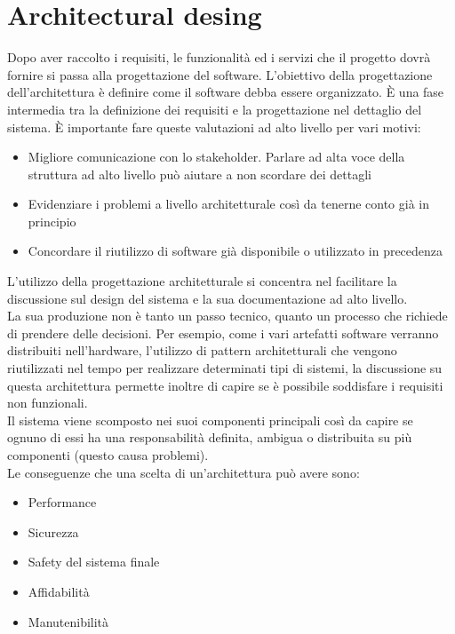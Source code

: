 \section{Architectural desing}
\label{sec:06_architectural_desing}
Dopo aver raccolto i requisiti, le funzionalità ed i servizi che il progetto dovrà fornire si passa alla progettazione del software.
L'obiettivo della progettazione dell'architettura è definire come il software debba essere organizzato.
È una fase intermedia tra la definizione dei requisiti e la progettazione nel dettaglio del sistema.
È importante fare queste valutazioni ad alto livello per vari motivi:
\begin{itemize}[noitemsep]
    \item Migliore comunicazione con lo stakeholder. Parlare ad alta voce della struttura ad alto livello può aiutare a non scordare dei dettagli
    \item Evidenziare i problemi a livello architetturale così da tenerne conto già in principio
    \item Concordare il riutilizzo di software già disponibile o utilizzato in precedenza
\end{itemize}
L'utilizzo della progettazione architetturale si concentra nel facilitare la discussione sul design del sistema e la sua documentazione ad alto livello.\\
La sua produzione non è tanto un passo tecnico, quanto un processo che richiede di prendere delle decisioni.
Per esempio, come i vari artefatti software verranno distribuiti nell'hardware, l'utilizzo di pattern architetturali che vengono riutilizzati nel tempo per realizzare determinati tipi di sistemi, la discussione su questa architettura permette inoltre di capire se è possibile soddisfare i requisiti non funzionali.\\
Il sistema viene scomposto nei suoi componenti principali così da capire se ognuno di essi ha una responsabilità definita, ambigua o distribuita su più componenti (questo causa problemi).\\
Le conseguenze che una scelta di un'architettura può avere sono:
\begin{itemize}[noitemsep]
    \item Performance
    \item Sicurezza
    \item Safety del sistema finale
    \item Affidabilità
    \item Manutenibilità
\end{itemize}
